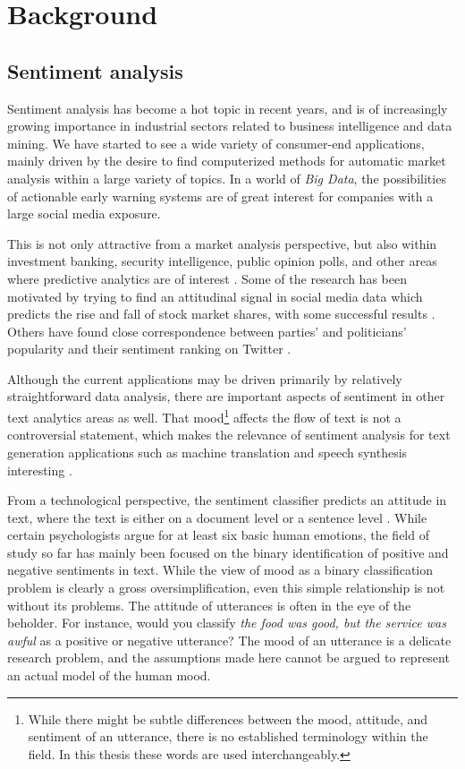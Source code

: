 \chapter{Background}
\label{background}

\section{Sentiment analysis}
\label{background-sentiment-classification}

Sentiment analysis has become a hot topic in recent years, and is of increasingly growing importance in industrial sectors related to business intelligence and data mining. We have started to see a wide variety of consumer-end applications, mainly driven by the desire to find computerized methods for automatic market analysis within a large variety of topics. In a world of \emph{Big Data}, the possibilities of actionable early warning systems are of great interest for companies with a large social media exposure.

This is not only attractive from a market analysis perspective, but also within investment banking, security intelligence, public opinion polls, and other areas where predictive analytics are of interest \parencite{Karlgren2012Usefulness}. Some of the research has been motivated by trying to find an attitudinal signal in social media data which predicts the rise and fall of stock market shares, with some successful results \parencite{Bollen2011Twitter}. Others have found close correspondence between parties' and politicians' popularity and their sentiment ranking on Twitter \parencite{Tumasjan2010Predicting}.

Although the current applications may be driven primarily by relatively straightforward data analysis, there are important aspects of sentiment in other text analytics areas as well. That mood\footnote{While there might be subtle differences between the mood, attitude, and sentiment of an utterance, there is no established terminology within the field. In this thesis these words are used interchangeably.} affects the flow of text is not a controversial statement, which makes the relevance of sentiment analysis for text generation applications such as machine translation and speech synthesis interesting \parencite{Wei2010Cross,Alm2005Emotions}.

From a technological perspective, the sentiment classifier predicts an attitude in text, where the text is either on a document level or a sentence level \parencite{Kim2013Beyond}. While certain psychologists argue for at least six basic human emotions, the field of study so far has mainly been focused on the binary identification of positive and negative sentiments in text. While the view of mood as a binary classification problem is clearly a gross oversimplification, even this simple relationship is not without its problems. The attitude of utterances is often in the eye of the beholder. For instance, would you classify \emph{the food was good, but the service was awful} as a positive or negative utterance? The mood of an utterance is a  delicate research problem, and the assumptions made here cannot be argued to represent an actual model of the human mood.

